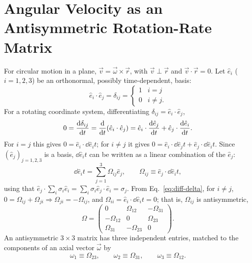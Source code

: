 \documentclass[11pt]{article}
\newcommand{\Om}{\Omega}
\begin{document}
\section{Angular Velocity as an Antisymmetric Rotation-Rate Matrix}

For circular motion in a plane, $\vec v=\vec\omega\times\vec r$, with $\vec v\perp\vec r$ and $\vec v\cdot\vec r=0$. Let $\hat e_i$ ($i=1,2,3$) be an orthonormal, possibly time-dependent, basis:
\begin{equation}
\hat e_i\cdot\hat e_j = \delta_{ij} = \begin{cases}1 & i=j\\ 0 & i\neq j.\end{cases}
\label{eq:orthonormal}
\end{equation}
For a rotating coordinate system, differentiating $\delta_{ij}=\hat e_i\cdot\hat e_j$,
\begin{equation}
0 = \frac{\mathrm{d} \delta_{ij}}{\mathrm{d} t} = \frac{\mathrm{d} }{\mathrm{d} t}(\hat e_i\cdot\hat e_j) = \hat e_i\cdot\frac{\mathrm{d} \hat e_j}{\mathrm{d} t} + \hat e_j\cdot\frac{\mathrm{d} \hat e_i}{\mathrm{d} t}.
\label{eq:diff-delta}
\end{equation}
For $i=j$ this gives $0=\hat e_i\cdot \dd{\hat e_i}{t}$; for $i\neq j$ it gives $0=\hat e_i\cdot\dd{\hat e_j}{t}+\hat e_j\cdot\dd{\hat e_i}{t}$. Since $(\hat e_j)_{j=1,2,3}$ is a basis, $\dd{\hat e_i}{t}$ can be written as a linear combination of the $\hat e_j$:
\begin{equation}
\boxed{\dd{\hat e_i}{t} = \sum_{j=1}^3 \Om_{ij}\hat e_j, \qquad \Om_{ij}\equiv \hat e_j\cdot\dd{\hat e_i}{t},}
\label{eq:Omega-def}
\end{equation}
using that $\hat e_j\cdot\sum_i \sigma_i\hat e_i = \sum_i\sigma_i\hat e_j\cdot\hat e_i=\sigma_j$. From Eq.~\eqref{eq:diff-delta}, for $i\neq j$, $0=\Om_{ij}+\Om_{ji}\Rightarrow \Om_{ji}=-\Om_{ij}$, and $\Om_{ii}=\hat e_i\cdot\dd{\hat e_i}{t}=0$; that is, $\Om_{ij}$ is antisymmetric,
\begin{equation}
\Om = \begin{pmatrix} 0 & \Om_{12} & -\Om_{31}\\ -\Om_{12} & 0 & \Om_{23}\\ \Om_{31} & -\Om_{23} & 0\end{pmatrix}.
\label{eq:Omega-matrix}
\end{equation}
An antisymmetric $3\times3$ matrix has three independent entries, matched to the components of an axial vector $\vec\omega$ by
\begin{equation}
\omega_1\equiv\Om_{23}, \qquad \omega_2\equiv\Om_{31}, \qquad \omega_3\equiv\Om_{12}.
\label{eq:omega-axial}
\end{equation}
\end{document}
